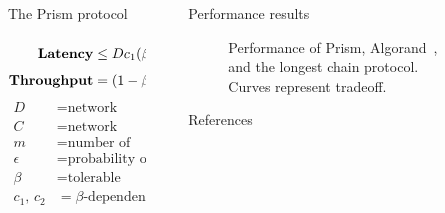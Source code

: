 \documentclass[final]{beamer}
\newlength{\sepwidth}
\newlength{\colwidth}
\newcommand{\separatorcolumn}{\begin{column}{\sepwidth}\end{column}}
\begin{document}
\begin{frame}[t]
\begin{columns}[t]
\begin{column}{\colwidth}
\begin{alertblock}{The Prism protocol}
  \begin{multicols}{2}

  \begin{align*}
   \text{\textbf{Latency}} &\leq D c_1(\beta) + \frac{D c_2(\beta)}{m}\log \frac{1}{\epsilon} \\
   \text{\textbf{Throughput}} &= (1-\beta) C
  \end{align*}
  \break 
  \begin{align*}
      D &= \text{network propagation delay} \\
      C &= \text{network bandwidth} \\
      m &= \text{number of voter chains} \\
      \epsilon &= \text{probability of double-spending attack} \\
      \beta &= \text{tolerable adversarial fraction} \\
      c_1\text{, }c_2 &= \beta\text{-dependent constants.} 
  \end{align*}
  
  \end{multicols}

  
    

  
  

  \end{alertblock}

\end{column}

\separatorcolumn

\begin{column}{\colwidth}

\begin{block}{Performance results}
  
    \begin{figure}
      \centering
      
      \caption{Performance of Prism, Algorand~\cite{algorand}, and the longest chain protocol. Curves represent tradeoff.}
    \end{figure}
  \end{block}

  \begin{block}{References}

    \nocite{*}
    \footnotesize{}

  \end{block}

\end{column}

\separatorcolumn
\end{columns}
\end{frame}
\end{document}
